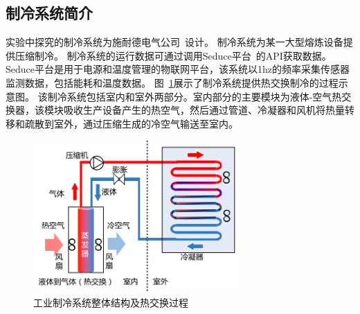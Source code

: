 \subsection{制冷系统简介}
\label{sec:ecotype_description}

实验中探究的制冷系统为施耐德电气公司~\cite{InrowACRD602}设计。
制冷系统为某一大型熔炼设备提供压缩制冷。
制冷系统的运行数据可通过调用Seduce平台~\cite{SeducePastor2018}的API获取数据。
Seduce平台是用于电源和温度管理的物联网平台，该系统以1hz的频率采集传感器监测数据，包括能耗和温度数据。
图~\ref{fig:inrow_3dArchitecture}展示了制冷系统提供热交换制冷的过程示意图。
该制冷系统包括室内和室外两部分。室内部分的主要模块为液体-空气热交换器，该模块吸收生产设备产生的热空气，然后通过管道、冷凝器和风机将热量转移和疏散到室外，通过压缩生成的冷空气输送至室内。

\begin{figure}[!htbp]
  \centering
  \includegraphics[width=0.7\textwidth]{figures/chapter4/inrow_architecture.pdf}
  \caption{工业制冷系统整体结构及热交换过程}
\label{fig:inrow_3dArchitecture} 
\end{figure}

